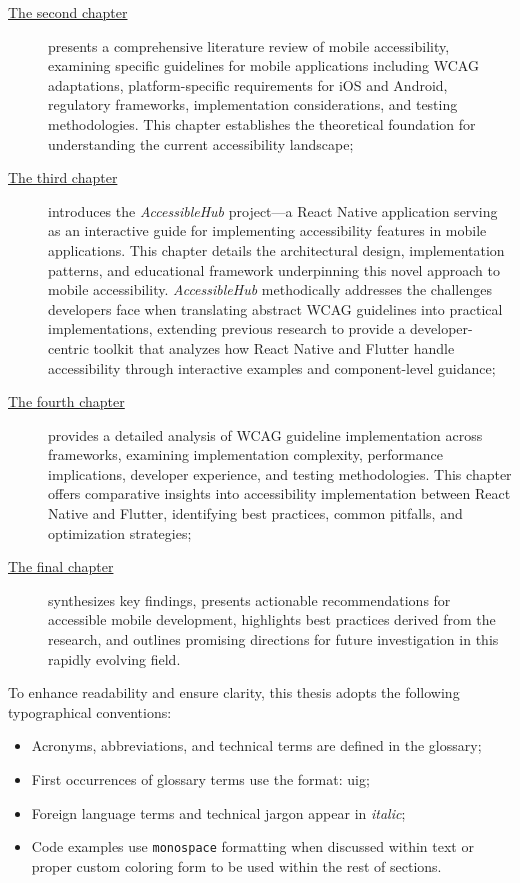 \begin{description}
    \item[{\hyperref[chap:accessibility]{The second chapter}}] presents a comprehensive literature review of mobile accessibility, examining specific guidelines for mobile applications including WCAG adaptations, platform-specific requirements for iOS and Android, regulatory frameworks, implementation considerations, and testing methodologies. This chapter establishes the theoretical foundation for understanding the current accessibility landscape;
    
    \item[{\hyperref[chap:accessibility-toolkit]{The third chapter}}] introduces the \textit{AccessibleHub} project—a React Native application serving as an interactive guide for implementing accessibility features in mobile applications. This chapter details the architectural design, implementation patterns, and educational framework underpinning this novel approach to mobile accessibility. \textit{AccessibleHub} methodically addresses the challenges developers face when translating abstract WCAG guidelines into practical implementations, extending previous research to provide a developer-centric toolkit that analyzes how React Native and Flutter handle accessibility through interactive examples and component-level guidance;
    
    \item[{\hyperref[chap:accessibility-implementation]{The fourth chapter}}] provides a detailed analysis of WCAG guideline implementation across frameworks, examining implementation complexity, performance implications, developer experience, and testing methodologies. This chapter offers comparative insights into accessibility implementation between React Native and Flutter, identifying best practices, common pitfalls, and optimization strategies;
    
    \item[{\hyperref[chap:conclusions]{The final chapter}}] synthesizes key findings, presents actionable recommendations for accessible mobile development, highlights best practices derived from the research, and outlines promising directions for future investigation in this rapidly evolving field.
\end{description}

To enhance readability and ensure clarity, this thesis adopts the following typographical conventions:
\begin{itemize}
    \item Acronyms, abbreviations, and technical terms are defined in the glossary;
    \item First occurrences of glossary terms use the format: \gls{uig};
    \item Foreign language terms and technical jargon appear in \textit{italic};
    \item Code examples use \texttt{monospace} formatting when discussed within text or proper custom coloring form to be used within the rest of sections.
\end{itemize}

\newpage